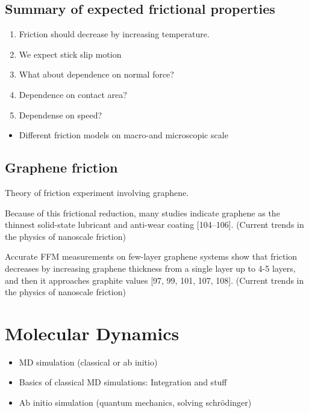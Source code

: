 \subsection{Summary of expected frictional properties}
\begin{enumerate}
  \item Friction should decrease by increasing temperature.
  \item We expect stick slip motion
  \item What about dependence on normal force?
  \item Dependence on contact area?
  \item Dependense on speed? 
\end{enumerate}

\begin{itemize}
  \item Different friction models on macro-and microscopic scale
\end{itemize}


\subsection{Graphene friction}
Theory of friction experiment involving graphene.


Because of this frictional reduction, many studies indicate graphene as the thinnest solid-state lubricant and anti-wear coating [104–106].
(Current trends in the physics of nanoscale friction)


Accurate FFM measurements on few-layer graphene systems show that friction decreases by increasing graphene thickness from a single layer up
to 4-5 layers, and then it approaches graphite values [97, 99, 101, 107, 108]. (Current trends in the physics of nanoscale friction)




\section{Molecular Dynamics}


\begin{itemize}
  \item MD simulation (classical or ab initio)
  \item Basics of classical MD simulations: Integration and stuff
  \item Ab initio simulation (quantum mechanics, solving schrödinger)
\end{itemize}



